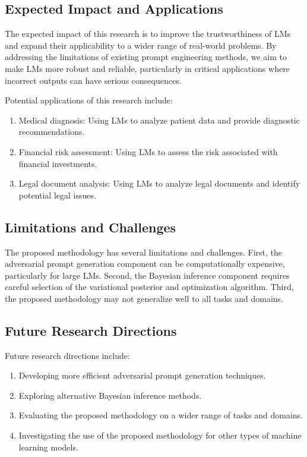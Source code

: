 \documentclass{article}
\begin{document}
\subsection{Expected Impact and Applications}
The expected impact of this research is to improve the trustworthiness of LMs and expand their applicability to a wider range of real-world problems. By addressing the limitations of existing prompt engineering methods, we aim to make LMs more robust and reliable, particularly in critical applications where incorrect outputs can have serious consequences.

Potential applications of this research include:

\begin{enumerate}
    \item Medical diagnosis: Using LMs to analyze patient data and provide diagnostic recommendations.
    \item Financial risk assessment: Using LMs to assess the risk associated with financial investments.
    \item Legal document analysis: Using LMs to analyze legal documents and identify potential legal issues.
\end{enumerate}

\subsection{Limitations and Challenges}
The proposed methodology has several limitations and challenges. First, the adversarial prompt generation component can be computationally expensive, particularly for large LMs. Second, the Bayesian inference component requires careful selection of the variational posterior and optimization algorithm. Third, the proposed methodology may not generalize well to all tasks and domains.

\subsection{Future Research Directions}
Future research directions include:

\begin{enumerate}
    \item Developing more efficient adversarial prompt generation techniques.
    \item Exploring alternative Bayesian inference methods.
    \item Evaluating the proposed methodology on a wider range of tasks and domains.
    \item Investigating the use of the proposed methodology for other types of machine learning models.
\end{enumerate}
\end{document}
